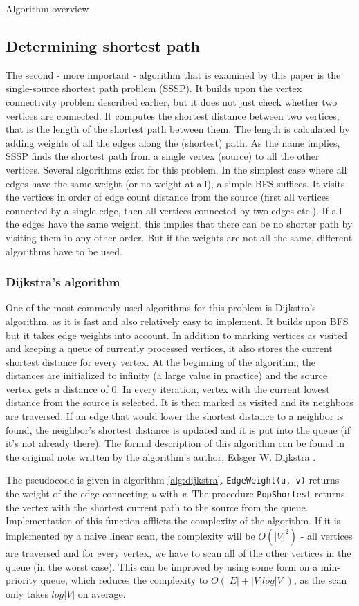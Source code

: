 \documentclass[a4paper,12pt,notitlepage,oneside]{article}
\begin{document}
\begin{section}{Algorithm overview}
\subsection{Determining shortest path}
The second - more important - algorithm that is examined by this paper is  the single-source shortest path problem (SSSP). It builds upon the vertex
connectivity problem described earlier, but it does not just check whether two vertices are connected. It computes the shortest distance between two vertices,
that is the length of the shortest path between them. The length is calculated by adding weights of all the edges along the (shortest) path.
As the name implies, SSSP finds the shortest path from a single vertex (source) to all the other vertices. Several algorithms exist for this problem.
In the simplest case where all edges have the same weight (or no weight at all), a simple BFS suffices. It visits the vertices in order of edge count distance
from the source (first all vertices connected by a single edge, then all vertices connected by two edges etc.). If all the edges have the same weight, this implies
that there can be no shorter path by visiting them in any other order. But if the weights are not all the same, different algorithms have to be used.

\subsubsection{Dijkstra's algorithm}
One of the most commonly used algorithms for this problem is Dijkstra's algorithm, as it is fast and also relatively easy to implement.
It builds upon BFS but it takes edge weights into account. In addition to marking vertices as visited and keeping a queue of currently processed vertices,
it also stores the current shortest distance for every vertex. At the beginning of the algorithm, the distances are initialized to infinity
(a large value in practice) and the source vertex gets a distance of 0. In every iteration, vertex with the current lowest distance from the source is selected.
It is then marked as visited and its neighbors are traversed. If an edge that would lower the shortest distance to a neighbor is found, the neighbor's shortest
distance is updated and it is put into the queue (if it's not already there). The formal description of this algorithm can be found in the original note
written by the algorithm's author, Edsger W. Dijkstra \cite{dijkstra}.

The pseudocode is given in algorithm \ref{alg:dijkstra}. \texttt{EdgeWeight(u, v)} returns the weight of the edge connecting \textit{u} with \textit{v}.
The procedure \texttt{PopShortest} returns the vertex with the shortest current path to the source from the queue. Implementation of this function afflicts
the complexity of the algorithm. If it is implemented by a naive linear scan, the complexity will be \(O(|V|^2)\) - all vertices are traversed and for every vertex,
we have to scan all of the other vertices in the queue (in the worst case). This can be improved by using some form on a min-priority queue, which reduces the
complexity to \(O(|E| + |V| log |V|)\), as the scan only takes \(log |V|\) on average.


\end{section}
\end{document}
